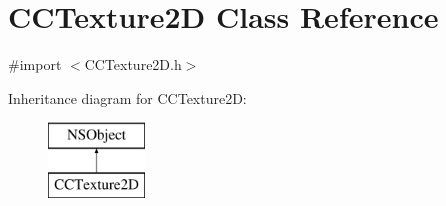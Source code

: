 \hypertarget{class_c_c_texture2_d}{\section{C\-C\-Texture2\-D Class Reference}
\label{class_c_c_texture2_d}
}


{\ttfamily \#import $<$C\-C\-Texture2\-D.\-h$>$}

Inheritance diagram for C\-C\-Texture2\-D\-:\begin{figure}[H]
\begin{center}
\leavevmode
\includegraphics[height=2.000000cm]{class_c_c_texture2_d}
\end{center}
\end{figure}
